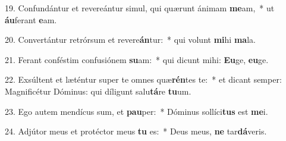 19. Confundántur et revereántur simul, qui quærunt ánimam \textbf{me}am,~*  ut \textbf{áu}ferant \textbf{e}am.\

20. Convertántur retrórsum et revere\textbf{án}tur:~*  qui volunt \textbf{mi}hi \textbf{ma}la.\

21. Ferant conféstim confusiónem \textbf{su}am:~*  qui dicunt mihi: \textbf{Eu}ge, \textbf{eu}ge.\

22. Exsúltent et læténtur super te omnes quæ\textbf{rén}tes te:~*  et dicant semper: Magnificétur Dóminus: qui díligunt salu\textbf{tá}re \textbf{tu}um.\

23. Ego autem mendícus sum, et \textbf{pau}per:~*  Dóminus sollíci\textbf{tus} est \textbf{me}i.\

24. Adjútor meus et protéctor meus \textbf{tu} es:~*  Deus meus, \textbf{ne} tar\textbf{dá}veris.\

